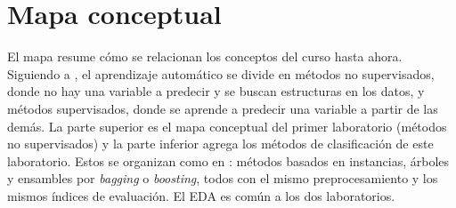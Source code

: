 \documentclass[11pt,a4paper]{article}
\let\citetOriginal\citet
\renewcommand*{\citet}[1]{\textbf{\citetOriginal{#1}}}%
\begin{document}
\section{Mapa conceptual}

El mapa resume cómo se relacionan los conceptos del curso hasta ahora. Siguiendo a \citet{james2013}, el aprendizaje automático se divide en métodos no supervisados, donde no hay una variable a predecir y se buscan estructuras en los datos, y métodos supervisados, donde se aprende a predecir una variable a partir de las demás. La parte superior es el mapa conceptual del primer laboratorio (métodos no supervisados) y la parte inferior agrega los métodos de clasificación de este laboratorio. Estos se organizan como en \citet{hastie2009}: métodos basados en instancias, árboles y ensambles por \textit{bagging} o \textit{boosting}, todos con el mismo preprocesamiento y los mismos índices de evaluación. El EDA es común a los dos laboratorios.
\end{document}
